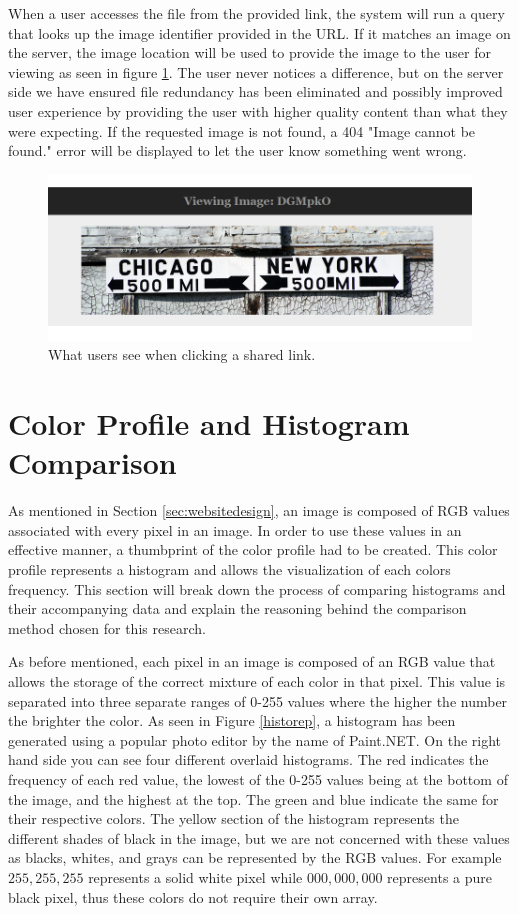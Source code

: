 When a user accesses the file from the provided link, the system will run a query that looks up the image identifier provided in the URL. If it matches an image on the server, the image location will be used to provide the image to the user for viewing as seen in figure \ref{viewimage}. The user never notices a difference, but on the server side we have ensured file redundancy has been eliminated and possibly improved user experience by providing the user with higher quality content than what they were expecting. If the requested image is not found, a 404 "Image cannot be found." error will be displayed to let the user know something went wrong.

\begin{figure}[htbp]
\centering
\includegraphics[width=5.5in]{viewimage}
\caption{What users see when clicking a shared link.}
\label{viewimage}
\end{figure}

\section{Color Profile and Histogram Comparison} \label{sec:histogram}
As mentioned in Section \ref{sec:websitedesign}, an image is composed of RGB values associated with every pixel in an image. In order to use these values in an effective manner, a thumbprint of the color profile had to be created. This color profile represents a histogram and allows the visualization of each colors frequency. This section will break down the process of comparing histograms and their accompanying data and explain the reasoning behind the comparison method chosen for this research.

As before mentioned, each pixel in an image is composed of an RGB value that allows the storage of the correct mixture of each color in that pixel. This value is separated into three separate ranges of 0-255 values where the higher the number the brighter the color. As seen in Figure \ref{historep}, a histogram has been generated using a popular photo editor by the name of Paint.NET. On the right hand side you can see four different overlaid histograms. The red indicates the frequency of each red value, the lowest of the 0-255 values being at the bottom of the image, and the highest at the top. The green and blue indicate the same for their respective colors. The yellow section of the histogram represents the different shades of black in the image, but we are not concerned with these values as blacks, whites, and grays can be represented by the RGB values. For example $255,255,255$ represents a solid white pixel while $000,000,000$ represents a pure black pixel, thus these colors do not require their own array.

